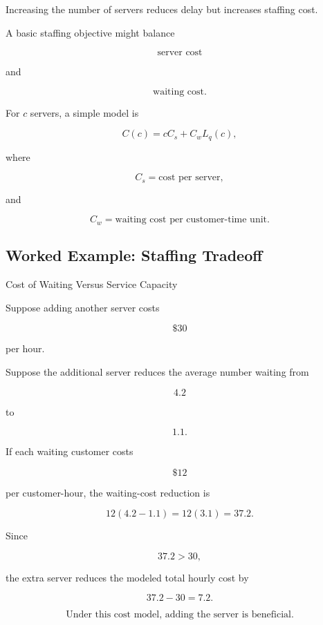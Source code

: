 Increasing the number of servers reduces delay but increases staffing cost.

A basic staffing objective might balance

\[
\boxed{
\text{server cost}
}
\]

and

\[
\boxed{
\text{waiting cost}.
}
\]

For \(c\) servers, a simple model is

\[
\boxed{
C(c)
=
cC_s
+
C_wL_q(c),
}
\]

where

\[
C_s
=
\text{cost per server},
\]

and

\[
C_w
=
\text{waiting cost per customer-time unit}.
\]

\subsection{Worked Example: Staffing Tradeoff}
\label{subsec:worked-staffing-tradeoff}

\begin{workedexamplebox}{Cost of Waiting Versus Service Capacity}

Suppose adding another server costs

\[
\$30
\]

per hour.

Suppose the additional server reduces the average number waiting from

\[
4.2
\]

to

\[
1.1.
\]

If each waiting customer costs

\[
\$12
\]

per customer-hour, the waiting-cost reduction is

\[
12(4.2-1.1)
=
12(3.1)
=
37.2.
\]

Since

\[
37.2>30,
\]

the extra server reduces the modeled total hourly cost by

\[
37.2-30
=
7.2.
\]

\begin{answerbox}
\[
\boxed{
\text{Under this cost model, adding the server is beneficial.}
}
\]
\end{answerbox}

\end{workedexamplebox}

